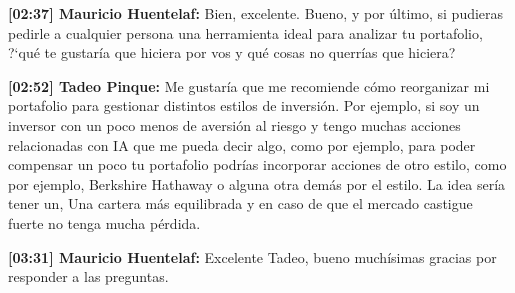 \par\noindent\textbf{[02:37] Mauricio Huentelaf:} Bien, excelente. Bueno, y por último, si pudieras pedirle a cualquier persona una herramienta ideal para analizar tu portafolio, ?`qué te gustaría que hiciera por vos y qué cosas no querrías que hiciera?
\par\noindent\textbf{[02:52] Tadeo Pinque:} Me gustaría que me recomiende cómo reorganizar mi portafolio para gestionar distintos estilos de inversión. Por ejemplo, si soy un inversor con un poco menos de aversión al riesgo y tengo muchas acciones relacionadas con IA que me pueda decir algo, como por ejemplo, para poder compensar un poco tu portafolio podrías incorporar acciones de otro estilo, como por ejemplo, Berkshire Hathaway o alguna otra demás por el estilo. La idea sería tener un, Una cartera más equilibrada y en caso de que el mercado castigue fuerte no tenga mucha pérdida.
\par\noindent\textbf{[03:31] Mauricio Huentelaf:} Excelente Tadeo, bueno muchísimas gracias por responder a las preguntas.

\label{annex:entrevista-fabricio}

